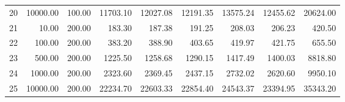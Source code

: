 \begin{table}[ht]
\begin{tabular}{rrrrrrrrr}
  20 & 10000.00 & 100.00 & 11703.10 & 12027.08 & 12191.35 & 13575.24 & 12455.62 & 20624.00 \\ 
  21 & 10.00 & 200.00 & 183.30 & 187.38 & 191.25 & 208.03 & 206.23 & 420.50 \\ 
  22 & 100.00 & 200.00 & 383.20 & 388.90 & 403.65 & 419.97 & 421.75 & 655.50 \\ 
  23 & 500.00 & 200.00 & 1225.50 & 1258.68 & 1290.15 & 1417.49 & 1400.03 & 8818.80 \\ 
  24 & 1000.00 & 200.00 & 2323.60 & 2369.45 & 2437.15 & 2732.02 & 2620.60 & 9950.10 \\ 
  25 & 10000.00 & 200.00 & 22234.70 & 22603.33 & 22854.40 & 24543.37 & 23394.95 & 35343.20 \\ 
   \hline
\end{tabular}
\end{table}
